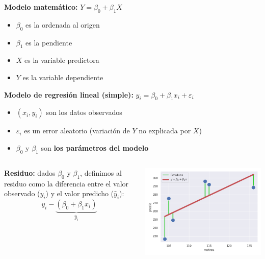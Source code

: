 \documentclass[aspectratio=169, usenames,dvipsnames]{beamer}
\begin{document}
\begin{frame}
    \textbf{Modelo matemático:} $Y = \beta_0 + \beta_1 X$
    \begin{itemize}
        \item $\beta_0$ es la ordenada al origen
        \item $\beta_1$ es la pendiente
        \item $X$ es la variable predictora
        \item $Y$ es la variable dependiente
    \end{itemize}
    \textbf{Modelo de regresión lineal (simple):} $y_i = \beta_0 + \beta_1x_i + \varepsilon_i$
    \begin{itemize}
        \item $(x_i, y_i)$ son los datos observados
        \item $\varepsilon_i$ es un error aleatorio (variación de $Y$ no explicada por $X$)
        \item $\beta_0$ y $\beta_1$ son \textbf{los parámetros del modelo}
    \end{itemize}
\end{frame}

\begin{frame}
\begin{columns}
    \textbf{Residuo:} dados $\beta_0$ y $\beta_1$, definimos al residuo como la diferencia entre el valor observado ($y_i$) y el valor predicho ($\hat{y}_i$):
    \[y_i - \underbrace{(\beta_0 + \beta_1x_i)}_{
     \textstyle \hat{y}_i}\]

    \centering
    \includegraphics[width=\textwidth]{img/regresion_ej_residuos.png}
\end{columns}
\end{frame}
\end{document}
